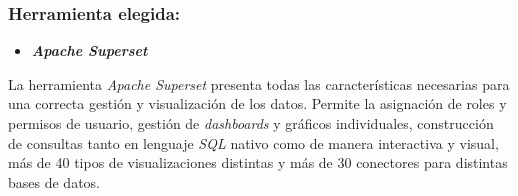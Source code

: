 \subsubsection{Herramienta elegida:}

\begin{itemize}
    \item \textbf{\textit{Apache Superset}}
\end{itemize}

La herramienta \textit{Apache Superset} presenta todas las características necesarias para una correcta gestión y visualización de los datos. Permite la asignación de roles y permisos de usuario, gestión de \textit{dashboards} y gráficos individuales, construcción de consultas tanto en lenguaje \textit{SQL} nativo como de manera interactiva y visual, más de 40 tipos de visualizaciones distintas y más de 30 conectores para distintas bases de datos.
